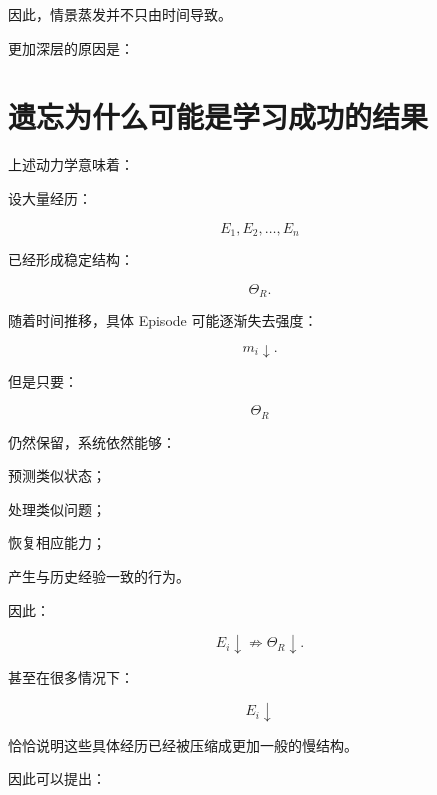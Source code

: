 \begin{statementbox}
\centering
{}
\end{statementbox}

因此，情景蒸发并不只由时间导致。

更加深层的原因是：

\begin{statementbox}
\centering
{}
\end{statementbox}

\section{遗忘为什么可能是学习成功的结果}

上述动力学意味着：

\begin{statementbox}
\centering
{}
\end{statementbox}

设大量经历：

\[
E_1,E_2,\ldots,E_n
\]

已经形成稳定结构：

\[
\Theta_R.
\]

随着时间推移，具体 Episode 可能逐渐失去强度：

\[
m_i\downarrow.
\]

但是只要：

\[
\Theta_R
\]

仍然保留，系统依然能够：

预测类似状态；

处理类似问题；

恢复相应能力；

产生与历史经验一致的行为。

因此：

\[
E_i\downarrow
\not\Rightarrow
\Theta_R\downarrow.
\]

甚至在很多情况下：

\[
\boxed{
E_i\downarrow
}
\]

恰恰说明这些具体经历已经被压缩成更加一般的慢结构。

因此可以提出：

\begin{statementbox}
\centering
{}
\end{statementbox}


